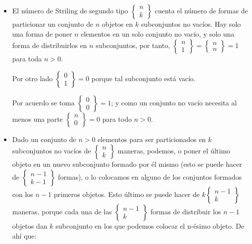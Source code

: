 \begin{itemize}
    \item{
		El n\'umero de Striling de segundo tipo
		$\left\{\begin{smallmatrix}
			n\\
			k
		\end{smallmatrix}\right\}$
		cuenta el n\'umero de formas de particionar un conjunto de $n$ objetos en $k$ subconjuntos no vac\'ios. 
		Hay solo una forma de poner $n$ elementos en un solo conjunto no vac\'io, y solo una forma de 
		distribuirlos en $n$ subconjuntos, por tanto, 
		$\left\{\begin{smallmatrix}
			n\\
			1
		\end{smallmatrix}\right\} 
		= 
		\left\{\begin{smallmatrix}
			n\\
			n
		\end{smallmatrix}\right\}
		= 1$
		para toda $n > 0$. 
		
		Por otro lado  
		$\left\{\begin{smallmatrix}
			0\\
			1
		\end{smallmatrix}\right\} = 0$ porque tal subconjunto est\'a vac\'io. 
		
		Por acuerdo se toma
		$\left\{\begin{smallmatrix}
			0\\
			0
		\end{smallmatrix}\right\} = 1$;
		y como un conjunto no vac\'io necesita al menos una parte
		$\left\{\begin{smallmatrix}
			n\\
			0
		\end{smallmatrix}\right\} = 0$ para todo $n>0$.	
    }
    \item{
       Dado un conjunto de $n > 0$ elementos para ser particionados en $k$ subconjuntos no vac\'ios de 
       $\left\{\begin{smallmatrix}
			n\\
			k
		\end{smallmatrix}\right\}$
	   maneras, podemos, o poner el \'ultimo objeto en un nuevo subconjunto formado por \'el mismo 
	   (esto se puede hacer de 
       $\left\{\begin{smallmatrix}
			n - 1\\
			k - 1
		\end{smallmatrix}\right\}$
	   formas), o lo colocamos en alguno de los conjuntos formados con los $n-1$ primeros objetos.  
	   Esto \'ultimo se puede hacer de 
	   $k
	   \left\{\begin{smallmatrix}
			n - 1\\
			k
		\end{smallmatrix}\right\}$  
		maneras, porque cada una de las 
		$\left\{\begin{smallmatrix}
			n-1\\
			k
		\end{smallmatrix}\right\}$
		formas de distribuir los $n-1$ objetos dan $k$ subconjunto en los que podemos colocar el n-\'esimo
		objeto.
		De ah\'i que:
		
}
\end{itemize}
